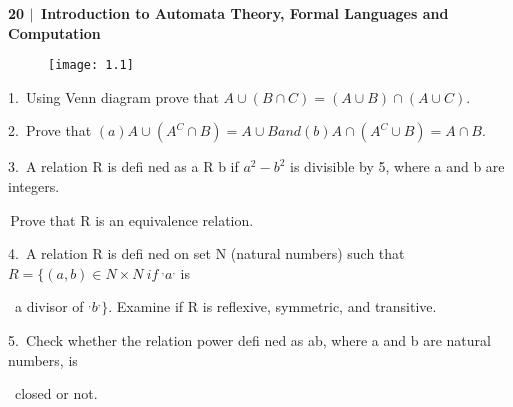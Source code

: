 \documentclass[10pt,a4paper]{book}
\begin{document}
\scriptsize

\begin{flushleft}
\textsf{\textbf{20\: $|$ \,Introduction to Automata Theory, Formal Languages and Computation}}
\end{flushleft}

\begin{figure}[h]
  \centering
  \texttt{[image: 1.1]}\\
\end{figure}

1.\, Using Venn diagram prove that $A \cup (B \cap C) = (A \cup B) \cap (A \cup C)$.

2.\, Prove that $(a) A \cup (A^{C} \cap B) = A \cup B and (b) A \cap (A^{C} \cup B) = A \cap B$.

3.\, A relation R is defi ned as a R b if $ a^{2} - b^{2}$ is divisible by 5, where a and b are integers.

\quad\,Prove that R is an equivalence relation.

4.\, A relation R is defi ned on set N (natural numbers) such that $R = \{(a, b) \in N \times N \:if \: ^{,}a^{,} $ is

\quad\, a divisor of $^{,}b^{,}\}$. Examine if R is reflexive, symmetric, and transitive.

5.\, Check whether the relation power defi ned as ab, where a and b are natural numbers, is 

\quad\, closed or not.
\end{document}
